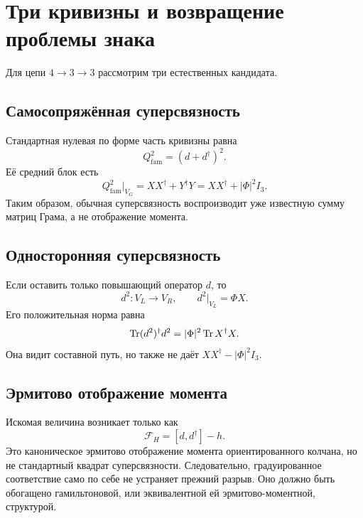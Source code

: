 \section{Три кривизны и возвращение проблемы знака}

Для цепи $4\to3\to3$ рассмотрим три естественных кандидата.

\subsection{Самосопряжённая суперсвязность}

Стандартная нулевая по форме часть кривизны равна
\begin{equation}
 Q_{\mathrm{fam}}^2=(d+d^\dagger)^2.
\end{equation}
Её средний блок есть
\begin{equation}
 Q_{\mathrm{fam}}^2\big|_{V_G}
 =XX^\dagger+Y^\dagger Y
 =XX^\dagger+|\Phi|^2I_3.
 \label{eq:v5-superconnection-gram-sum}
\end{equation}
Таким образом, обычная суперсвязность воспроизводит уже известную сумму
матриц Грама, а не отображение момента.

\subsection{Односторонняя суперсвязность}

Если оставить только повышающий оператор $d$, то
\begin{equation}
 d^2:V_L\longrightarrow V_R,
 \qquad
 d^2\big|_{V_L}=\Phi X.
\end{equation}
Его положительная норма равна
\begin{equation}
 \operatorname{Tr} (d^2)^\dagger d^2
 =|\Phi|^2\operatorname{Tr} X^\dagger X.
 \label{eq:v5-holomorphic-path-norm}
\end{equation}
Она видит составной путь, но также не даёт
$XX^\dagger-|\Phi|^2I_3$.

\subsection{Эрмитово отображение момента}

Искомая величина возникает только как
\begin{equation}
 \mathcal F_H=[d,d^\dagger]-h.
 \label{eq:v5-hamiltonian-hodge-curvature}
\end{equation}
Это каноническое эрмитово отображение момента ориентированного колчана, но
не стандартный квадрат суперсвязности. Следовательно, градуированное
соответствие само по себе не устраняет прежний разрыв. Оно должно быть
обогащено гамильтоновой, или эквивалентной ей эрмитово-моментной,
структурой.

